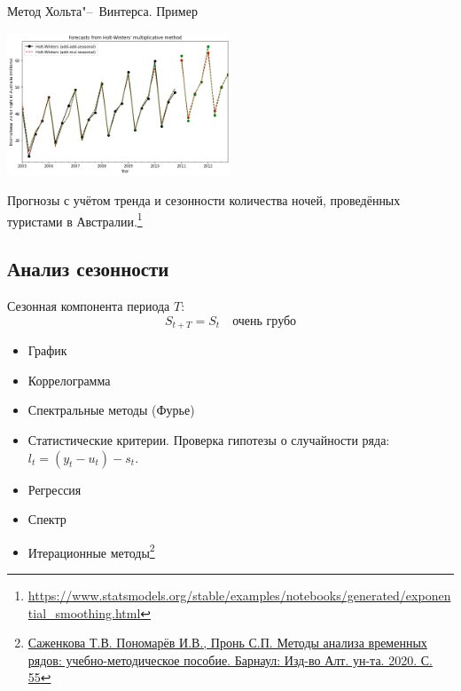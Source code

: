 \documentclass[10pt,pdf,utf8,hyperref={unicode},aspectratio=169]{beamer}
\begin{document}
\begin{frame}{Метод Хольта"--~Винтерса. Пример}
		\begin{center}
			\includegraphics[width=0.5\textwidth]{fig_7_2.png}
		\end{center}
		Прогнозы с учётом тренда и сезонности количества ночей, проведённых туристами в Австралии.\footnote{\url{https://www.statsmodels.org/stable/examples/notebooks/generated/exponential_smoothing.html}}
\end{frame}

\subsection{Анализ сезонности}
\begin{frame}{}
	Сезонная компонента периода $T$:
	$$
		S_{t+T} = S_t\quad  \text{очень грубо}
	$$
	\medskip
	\begin{itemize}
		\item График
		\item Коррелограмма
		\item Спектральные методы (Фурье)
		\item Статистические критерии. Проверка гипотезы о случайности ряда: $l_t = (y_t - u_t) - s_t$.
	\end{itemize}
	\medskip
	\begin{itemize}
		\item Регрессия
		\item Спектр
		\item Итерационные методы\footnote{\href{http://elibrary.asu.ru/xmlui/bitstream/handle/asu/8717/book.pdf}{Саженкова Т.В.  Пономарёв И.В., Пронь 	С.П. Методы анализа временных рядов: учебно-методическое пособие. Барнаул: Изд-во Алт. ун-та. 2020. С. 55}}
	\end{itemize}
\end{frame}
\end{document}
